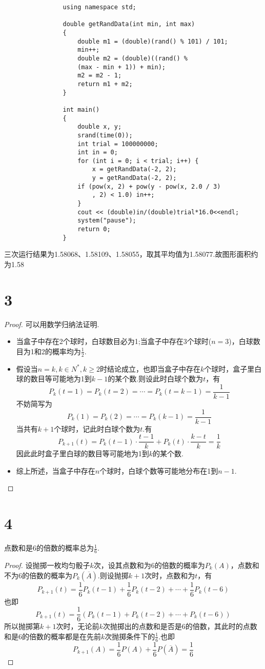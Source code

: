 \documentclass[twocolumn]{article}
\begin{document}
\begin{CJK}{UTF8}{gbsn}
\begin{verbatim}
				using namespace std;
				
				double getRandData(int min, int max)
				{
				    double m1 = (double)(rand() % 101) / 101;                     
				    min++;
				    double m2 = (double)((rand() % 
				    (max - min + 1)) + min);    
				    m2 = m2 - 1;
				    return m1 + m2;                                                            
				}
				
				int main()
				{
				    double x, y;
				    srand(time(0));
				    int trial = 100000000;
				    int in = 0;
				    for (int i = 0; i < trial; i++) {
				        x = getRandData(-2, 2);
				        y = getRandData(-2, 2);
				    if (pow(x, 2) + pow(y - pow(x, 2.0 / 3)
				        , 2) < 1.0) in++;
				    }
				    cout << (double)in/(double)trial*16.0<<endl;
				    system("pause");
				    return 0;
				}
				\end{verbatim}
				三次运行结果为1.58068、1.58109、1.58055，取其平均值为1.58077.故图形面积约为1.58
			\section*{3}
				\begin{proof}
					可以用数学归纳法证明.
					\begin{itemize}
						\item 当盒子中存在2个球时，白球数目必为1;当盒子中存在3个球时($n=3$)，白球数目为1和2的概率均为$\frac{1}{2}$.
						\item 假设当$n=k,k\in N^*,k\ge2$时结论成立，也即当盒子中存在$k$个球时，盒子里白球的数目等可能地为1到$k-1$的某个数.则设此时白球个数为$t$，有\[P_k(t=1)=P_k(t=2)=\cdots=P_k(t=k-1)=\frac{1}{k-1}\]不妨简写为\[P_k(1)=P_k(2)=\cdots=P_k(k-1)=\frac{1}{k-1}\] 当共有$k+1$个球时，记此时白球个数为$t$.有\[P_{k+1}(t)=P_k(t-1)\cdot\frac{t-1}{k}+P_k(t)\cdot\frac{k-t}{k}=\frac{1}{k}\]因此此时盒子里白球的数目等可能地为1到$k$的某个数.
						\item 综上所述，当盒子中存在$n$个球时，白球个数等可能地分布在1到$n-1$.
						
					\end{itemize}
				\end{proof}
			\section*{4}
				点数和是6的倍数的概率总为$\frac{1}{6}$.
				\begin{proof}
					设抛掷一枚均匀骰子$k$次，设其点数和为6的倍数的概率为$P_k(A)$，点数和不为6的倍数的概率为$P_k(\overline{A})$.则设抛掷$k+1$次时，点数和为$t$，有\[P_{k+1}(t)=\frac{1}{6}P_{k}(t-1)+\frac{1}{6}P_{k}(t-2)+\cdots+\frac{1}{6}P_{k}(t-6)\]也即\[P_{k+1}(t)=\frac{1}{6}(P_k(t-1)+P_k(t-2)+\cdots+P_k(t-6))\]所以抛掷第$k+1$次时，无论前$k$次抛掷出的点数和是否是6的倍数，其此时的点数和是6的倍数的概率都是在先前$k$次抛掷条件下的$\frac{1}{6}$.也即\[P_{k+1}(A)=\frac{1}{6}P(A)+\frac{1}{6}P(\overline{A})=\frac{1}{6}\]
				\end{proof}
	\end{CJK}
\end{document}
